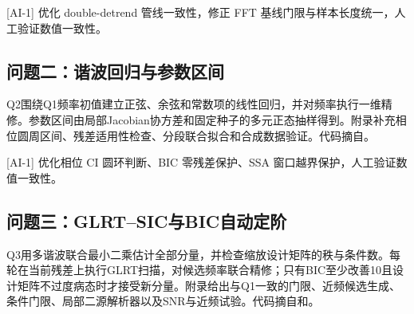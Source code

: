 \documentclass[withoutpreface,bwprint]{cumcmthesis}
\begin{document}
\begin{appendices}
    {\small [AI-1] 优化 double-detrend 管线一致性，修正 FFT 基线门限与样本长度统一，人工验证数值一致性。}

    \subsection{问题二：谐波回归与参数区间}
    Q2围绕Q1频率初值建立正弦、余弦和常数项的线性回归，并对频率执行一维精修。参数区间由局部Jacobian协方差和固定种子的多元正态抽样得到。附录补充相位圆周区间、残差适用性检查、分段联合拟合和合成数据验证。代码摘自。

    
    
    
    
    
    

    {\small [AI-1] 优化相位 CI 圆环判断、BIC 零残差保护、SSA 窗口越界保护，人工验证数值一致性。}

    \subsection{问题三：GLRT--SIC与BIC自动定阶}
    Q3用多谐波联合最小二乘估计全部分量，并检查缩放设计矩阵的秩与条件数。每轮在当前残差上执行GLRT扫描，对候选频率联合精修；只有BIC至少改善10且设计矩阵不过度病态时才接受新分量。附录给出与Q1一致的门限、近频候选生成、条件门限、局部二源解析器以及SNR与近频试验。代码摘自和。


\end{appendices}
\end{document}
